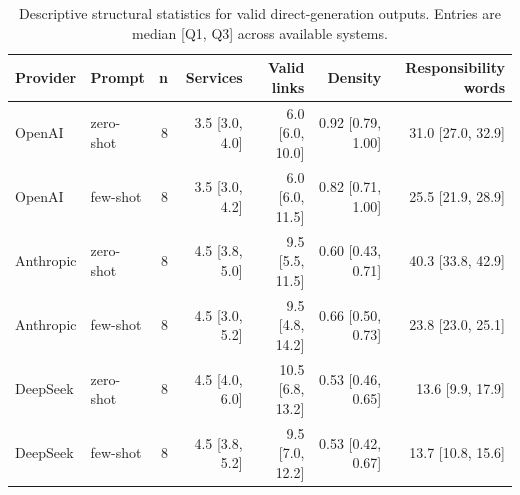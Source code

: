 \begin{table}[t]
\centering
\small
\begin{tabular}{llrrrrr}
\toprule
Provider & Prompt & n & Services & Valid links & Density & Responsibility words \\
\midrule
OpenAI & zero-shot & 8 & 3.5 [3.0, 4.0] & 6.0 [6.0, 10.0] & 0.92 [0.79, 1.00] & 31.0 [27.0, 32.9] \\
OpenAI & few-shot & 8 & 3.5 [3.0, 4.2] & 6.0 [6.0, 11.5] & 0.82 [0.71, 1.00] & 25.5 [21.9, 28.9] \\
Anthropic & zero-shot & 8 & 4.5 [3.8, 5.0] & 9.5 [5.5, 11.5] & 0.60 [0.43, 0.71] & 40.3 [33.8, 42.9] \\
Anthropic & few-shot & 8 & 4.5 [3.0, 5.2] & 9.5 [4.8, 14.2] & 0.66 [0.50, 0.73] & 23.8 [23.0, 25.1] \\
DeepSeek & zero-shot & 8 & 4.5 [4.0, 6.0] & 10.5 [6.8, 13.2] & 0.53 [0.46, 0.65] & 13.6 [9.9, 17.9] \\
DeepSeek & few-shot & 8 & 4.5 [3.8, 5.2] & 9.5 [7.0, 12.2] & 0.53 [0.42, 0.67] & 13.7 [10.8, 15.6] \\
\bottomrule
\end{tabular}
\caption{Descriptive structural statistics for valid direct-generation outputs. Entries are median [Q1, Q3] across available systems.}
\label{tab:direct-by-condition}
\end{table}
